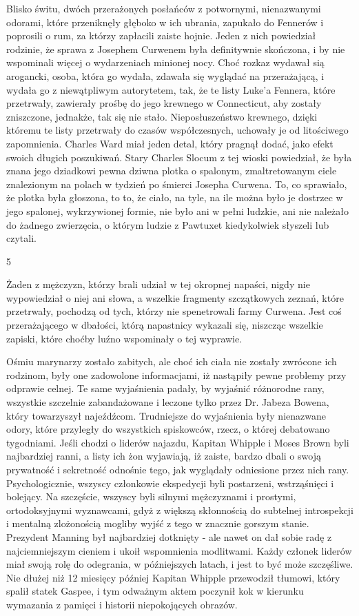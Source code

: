 Blisko świtu, dwóch przerażonych posłańców z potwornymi, nienazwanymi odorami, które przeniknęły głęboko w ich ubrania, zapukało do Fennerów i poprosili o rum, za którzy zapłacili zaiste hojnie. Jeden z nich powiedział rodzinie, że sprawa z Josephem Curwenem była definitywnie skończona, i by nie wspominali więcej o wydarzeniach minionej nocy. Choć rozkaz wydawał sią arogancki, osoba, która go wydała, zdawała się wyglądać na przerażającą, i wydała go z niewątpliwym autorytetem, tak, że te listy Luke'a Fennera, które przetrwały, zawierały prośbę do jego krewnego w Connecticut, aby zostały zniszczone, jednakże, tak się nie stało. Nieposłuszeństwo krewnego, dzięki któremu te listy przetrwały do czasów współczesnych, uchowały je od litościwego zapomnienia. Charles Ward miał jeden detal, który pragnął dodać, jako efekt swoich długich poszukiwań. Stary Charles Slocum z tej wioski powiedział, że była znana jego dziadkowi pewna dziwna plotka o spalonym, zmaltretowanym ciele znalezionym na polach w tydzień po śmierci Josepha Curwena. To, co sprawiało, że plotka była głoszona, to to, że ciało, na tyle, na ile można było je dostrzec w jego spalonej, wykrzywionej formie, nie było ani w pełni ludzkie, ani nie należało do żadnego zwierzęcia, o którym ludzie z Pawtuxet kiedykolwiek słyszeli lub czytali.

\begin{center}
5
\end{center}

Żaden z mężczyzn, którzy brali udział w tej okropnej napaści, nigdy nie wypowiedział o niej ani słowa, a wszelkie fragmenty szczątkowych zeznań, które przetrwały, pochodzą od tych, którzy nie spenetrowali farmy Curwena. Jest coś przerażającego w dbałości, którą napastnicy wykazali się, niszcząc wszelkie zapiski, które choćby luźno wspominały o tej wyprawie. 

Ośmiu marynarzy zostało zabitych, ale choć ich ciała nie zostały zwrócone ich rodzinom, były one zadowolone informacjami, iż nastąpiły pewne problemy przy odprawie celnej. Te same wyjaśnienia padały, by wyjaśnić różnorodne rany, wszystkie szczelnie zabandażowane i leczone tylko przez Dr. Jabeza Bowena, który towarzyszył najeźdźcom. Trudniejsze do wyjaśnienia były nienazwane odory, które przyległy do wszystkich spiskowców, rzecz, o której debatowano tygodniami. Jeśli chodzi o liderów najazdu, Kapitan Whipple i Moses Brown byli najbardziej ranni, a listy ich żon wyjawiają, iż zaiste, bardzo dbali o swoją prywatność i sekretność odnośnie tego, jak wyglądały odniesione przez nich rany. Psychologicznie, wszyscy członkowie ekspedycji byli postarzeni, wstrząśnięci i bolejący. Na szczęście, wszyscy byli silnymi mężczyznami i prostymi, ortodoksyjnymi wyznawcami, gdyż z większą skłonnością do subtelnej introspekcji i mentalną zlożonością mogliby wyjść z tego w znacznie gorszym stanie. Prezydent Manning był najbardziej dotknięty - ale nawet on dał sobie radę z najciemniejszym cieniem i ukoił wspomnienia modlitwami. Każdy członek liderów miał swoją rolę do odegrania, w późniejszych latach, i jest to być może szczęśliwe. Nie dłużej niż 12 miesięcy później Kapitan Whipple przewodził tłumowi, który spalił statek Gaspee, i tym odważnym aktem poczynił kok w kierunku wymazania z pamięci i historii niepokojących obrazów. 

